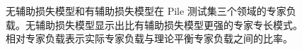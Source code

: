 \documentclass[lang=cn,a4paper,newtx]{elegantpaper}
\begin{document}
\begin{figure}[!t]
    \ContinuedFloat
\end{figure}

\begin{figure}[!t]
    \ContinuedFloat
    \caption{无辅助损失模型和有辅助损失模型在 Pile 测试集三个领域的专家负载。无辅助损失模型显示出比有辅助损失模型更强的专家专长模式。相对专家负载表示实际专家负载与理论平衡专家负载之间的比率。}
\label{fig:detailed_expert_load}
\end{figure}

\newpage
\end{document}
